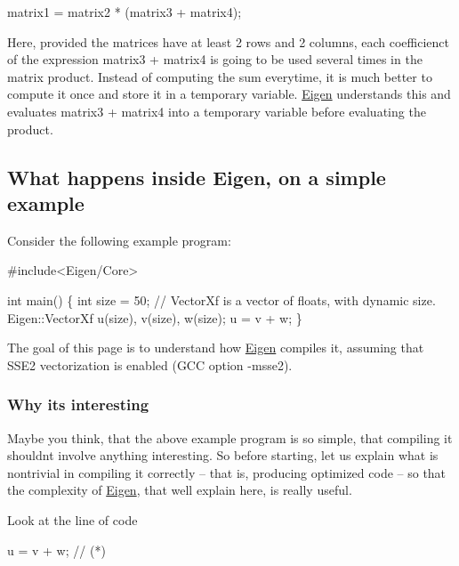 \begin{DoxyCode}
matrix1 = matrix2 * (matrix3 + matrix4); 
\end{DoxyCode}


Here, provided the matrices have at least 2 rows and 2 columns, each coefficienct of the expression {\ttfamily matrix3 + matrix4} is going to be used several times in the matrix product. Instead of computing the sum everytime, it is much better to compute it once and store it in a temporary variable. \hyperlink{namespace_eigen}{Eigen} understands this and evaluates {\ttfamily matrix3 + matrix4} into a temporary variable before evaluating the product. \hypertarget{TopicInsideEigenExample}{}\subsection{What happens inside Eigen, on a simple example}\label{TopicInsideEigenExample}




Consider the following example program\+:


\begin{DoxyCode}
\textcolor{preprocessor}{#include<Eigen/Core>}

\textcolor{keywordtype}{int} main()
\{
  \textcolor{keywordtype}{int} size = 50;
  \textcolor{comment}{// VectorXf is a vector of floats, with dynamic size.}
  Eigen::VectorXf u(size), v(size), w(size);
  u = v + w;
\}
\end{DoxyCode}


The goal of this page is to understand how \hyperlink{namespace_eigen}{Eigen} compiles it, assuming that S\+S\+E2 vectorization is enabled (G\+CC option -\/msse2).\hypertarget{_topic_inside_eigen_example_WhyInteresting}{}\subsubsection{Why it\textquotesingle{}s interesting}\label{_topic_inside_eigen_example_WhyInteresting}
Maybe you think, that the above example program is so simple, that compiling it shouldn\textquotesingle{}t involve anything interesting. So before starting, let us explain what is nontrivial in compiling it correctly -- that is, producing optimized code -- so that the complexity of \hyperlink{namespace_eigen}{Eigen}, that we\textquotesingle{}ll explain here, is really useful.

Look at the line of code 
\begin{DoxyCode}
u = v + w;   \textcolor{comment}{//   (*)}
\end{DoxyCode}


